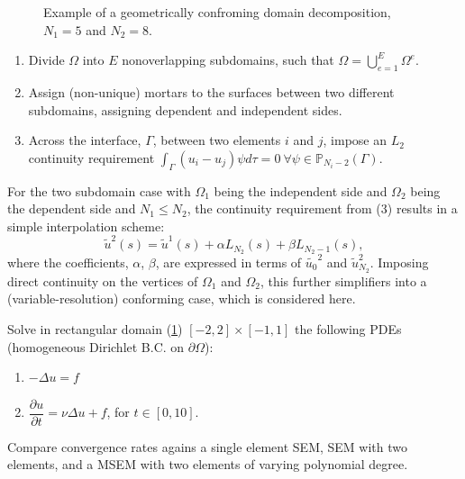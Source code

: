 \documentclass[final,t]{beamer}
\begin{document}
\begin{frame}[fragile]{}
\begin{columns}[t]
\begin{column}{.45\linewidth}
\begin{tcolorbox}[toplevelbox,adjusted title=Approach]
\begin{figure}
\caption{Example of a geometrically confroming domain decomposition, $N_1 = 5$ and $N_2 = 8$.}
\label{fig:domaindecomp}
      \end{figure}
\begin{enumerate}
\def\labelenumi{\arabic{enumi}.}
\item
  Divide \(\Omega\) into \(E\) nonoverlapping subdomains, such that
  \(\Omega=\bigcup_{e=1}^{E} \Omega ^e\).
\item
  Assign (non-unique) mortars to the surfaces between two different subdomains, assigning dependent and independent sides.
\item
  Across the interface, \(\Gamma\), between two elements \(i\) and
  \(j\), impose an \(L_2\) continuity requirement
  \(\int_{\Gamma}(u_i-u_j)\psi d\tau = 0\ \forall \psi \in \mathbb{P}_{N_i-2}(\Gamma)\).
\end{enumerate}

For the two subdomain case with \(\Omega_1\) being the independent side and \(\Omega_2\)
being the dependent side and $N_1 \le N_2$, the continuity requirement from (3) results
in a simple interpolation scheme:
\begin{equation}
\tilde{u}^2(s) = \tilde{u}^1(s) + \alpha L_{N_2}(s) + \beta L_{N_2-1}(s) \nonumber ,
\end{equation}
where the coefficients, $\alpha$, $\beta$, are expressed in terms of $\tilde{u_0}^2$ and
$\tilde{u}_{N_2}^2$. Imposing direct continuity on the vertices of $\Omega_1$ and $\Omega_2$,
this further simplifiers into a (variable-resolution) conforming case, which is considered here.

      \end{tcolorbox}

      \begin{tcolorbox}[toplevelbox,adjusted title= Test Cases]
      Solve in rectangular domain (\ref{fig:domaindecomp}) $[-2,2]\times[-1,1]$
      the following PDEs (homogeneous Dirichlet B.C. on $\partial\Omega$):
\begin{enumerate}
\item
$-\Delta u = f$
\item
$\dfrac{\partial u}{\partial t} = \nu \Delta u +f$, for $t\in[0,10]$.
\end{enumerate}
      Compare convergence rates agains a single element SEM, SEM with two elements,
      and a MSEM with two elements of varying polynomial degree.
      \end{tcolorbox}
    \end{column}


\end{columns}
\end{frame}
\end{document}
